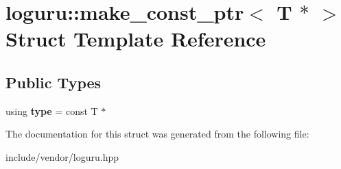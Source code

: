 \hypertarget{structloguru_1_1make__const__ptr_3_01_t_01_5_01_4}{}\section{loguru\+:\+:make\+\_\+const\+\_\+ptr$<$ T $\ast$ $>$ Struct Template Reference}
\label{structloguru_1_1make__const__ptr_3_01_t_01_5_01_4}
\subsection*{Public Types}
\begin{DoxyCompactItemize}
\item 
\mbox{\label{structloguru_1_1make__const__ptr_3_01_t_01_5_01_4_aa2b2504941063039cbf7bc3e3d77fb8e}} 
using {\bfseries type} = const T $\ast$
\end{DoxyCompactItemize}


The documentation for this struct was generated from the following file\+:\begin{DoxyCompactItemize}
\item 
include/vendor/loguru.\+hpp\end{DoxyCompactItemize}
